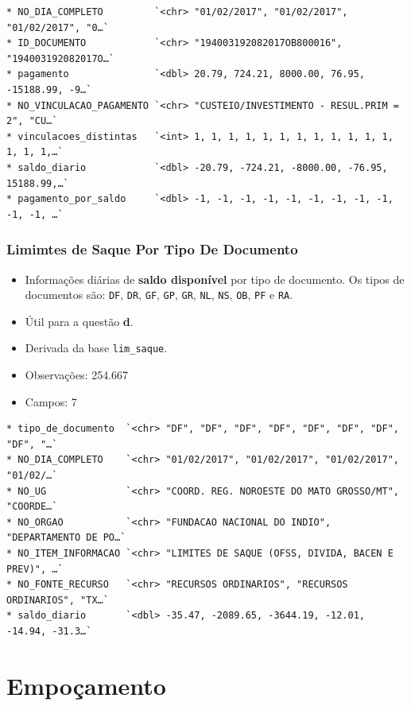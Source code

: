 \documentclass[
]{book}
\begin{document}
\begin{verbatim}
* NO_DIA_COMPLETO         `<chr> "01/02/2017", "01/02/2017", "01/02/2017", "0…`
* ID_DOCUMENTO            `<chr> "194003192082017OB800016", "194003192082017O…`
* pagamento               `<dbl> 20.79, 724.21, 8000.00, 76.95, -15188.99, -9…`
* NO_VINCULACAO_PAGAMENTO `<chr> "CUSTEIO/INVESTIMENTO - RESUL.PRIM = 2", "CU…`
* vinculacoes_distintas   `<int> 1, 1, 1, 1, 1, 1, 1, 1, 1, 1, 1, 1, 1, 1, 1,…`
* saldo_diario            `<dbl> -20.79, -724.21, -8000.00, -76.95, 15188.99,…`
* pagamento_por_saldo     `<dbl> -1, -1, -1, -1, -1, -1, -1, -1, -1, -1, -1, …`
\end{verbatim}

\hypertarget{limimtes-de-saque-por-tipo-de-documento}{%
\subsection{Limimtes de Saque Por Tipo De Documento}\label{limimtes-de-saque-por-tipo-de-documento}}

\begin{itemize}
\item
  Informações diárias de \textbf{saldo disponível} por tipo de documento. Os tipos de documentos são: \texttt{DF}, \texttt{DR}, \texttt{GF}, \texttt{GP}, \texttt{GR}, \texttt{NL}, \texttt{NS}, \texttt{OB}, \texttt{PF} e \texttt{RA}.
\item
  Útil para a questão \textbf{d}.
\item
  Derivada da base \texttt{lim\_saque}.
\item
  Observações: 254.667
\item
  Campos: 7
\end{itemize}

\begin{verbatim}
* tipo_de_documento  `<chr> "DF", "DF", "DF", "DF", "DF", "DF", "DF", "DF", "…`
* NO_DIA_COMPLETO    `<chr> "01/02/2017", "01/02/2017", "01/02/2017", "01/02/…`
* NO_UG              `<chr> "COORD. REG. NOROESTE DO MATO GROSSO/MT", "COORDE…`
* NO_ORGAO           `<chr> "FUNDACAO NACIONAL DO INDIO", "DEPARTAMENTO DE PO…`
* NO_ITEM_INFORMACAO `<chr> "LIMITES DE SAQUE (OFSS, DIVIDA, BACEN E PREV)", …`
* NO_FONTE_RECURSO   `<chr> "RECURSOS ORDINARIOS", "RECURSOS ORDINARIOS", "TX…`
* saldo_diario       `<dbl> -35.47, -2089.65, -3644.19, -12.01, -14.94, -31.3…`
\end{verbatim}

\hypertarget{empouxe7amento}{%
\chapter{Empoçamento}\label{empouxe7amento}}
\end{document}
